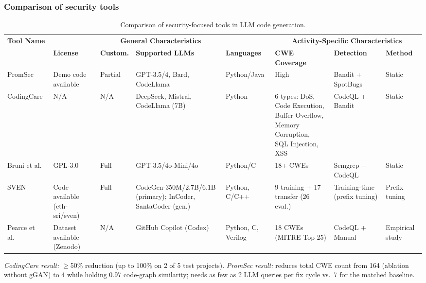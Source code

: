 \documentclass[10pt,a4paper]{article}
\begin{document}
\subsubsection{Comparison of security tools}
\begin{table}[!t]
\centering
\caption{Comparison of security-focused tools in LLM code generation.}
\label{tab:cmp_security}
\footnotesize
\setlength{\tabcolsep}{2pt}
\renewcommand{\arraystretch}{1.1}
\begin{tabularx}{\textwidth}{@{}p{55pt}p{55pt}p{30pt}p{65pt}p{48pt}p{88pt}p{65pt}X@{}}
\toprule
\multirow{2}{*}{\textbf{Tool Name}} & \multicolumn{4}{c}{\textbf{General Characteristics}} & \multicolumn{3}{c}{\textbf{Activity-Specific Characteristics}} \\
\cmidrule(lr){2-5} \cmidrule(lr){6-8}
 & \textbf{License} & \textbf{Custom.} & \textbf{Supported LLMs} & \textbf{Languages} & \textbf{CWE Coverage} & \textbf{Detection} & \textbf{Method} \\
\midrule
PromSec~\cite{nazzal2024promsec} & Demo code available & Partial & GPT-3.5/4, Bard, CodeLlama & Python/Java & High & Bandit + SpotBugs & Static \\
CodingCare~\cite{ding2025codingcare} & N/A & N/A & DeepSeek, Mistral, CodeLlama (7B) & Python & \makecell[l]{6 types: DoS, Code Execution,\\ Buffer Overflow, Memory Corruption,\\ SQL Injection, XSS} & CodeQL + Bandit & Static \\
Bruni et al.~\cite{bruni2025} & GPL-3.0 & Full & GPT-3.5/4o-Mini/4o & Python/C & 18+ CWEs & Semgrep + CodeQL & Static \\
SVEN~\cite{he2023sven} & Code available (eth-sri/sven) & Full & CodeGen-350M/2.7B/6.1B (primary); InCoder, SantaCoder (gen.) & Python, C/C++ & 9 training + 17 transfer (26 eval.) & Training-time (prefix tuning) & Prefix tuning \\
Pearce et al.~\cite{pearce2022} & Dataset available (Zenodo) & N/A & GitHub Copilot (Codex) & Python, C, Verilog & 18 CWEs (MITRE Top 25) & CodeQL + Manual & Empirical study \\
\bottomrule
\end{tabularx}
\begin{flushleft}
\footnotesize \textit{CodingCare result:} $\geq$50\% reduction (up to 100\% on 2 of 5 test projects).
\textit{PromSec result:} reduces total CWE count from 164 (ablation without gGAN) to 4 while holding 0.97 code-graph similarity; needs as few as 2 LLM queries per fix cycle vs.\ 7 for the matched baseline.
\end{flushleft}
\end{table}
\end{document}
